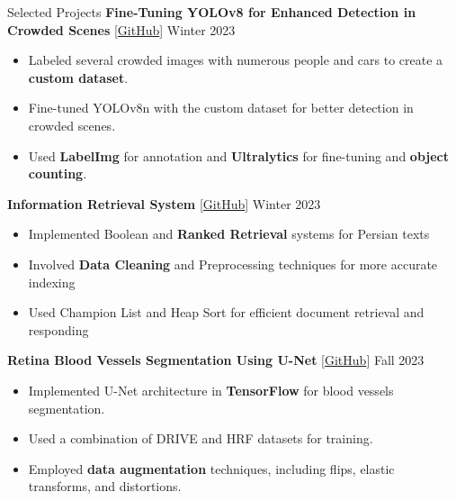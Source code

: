 \documentclass{resume}
\begin{document}
\begin{rSection}{Selected Projects}
    {\bf Fine-Tuning YOLOv8 for Enhanced Detection in Crowded Scenes} [\href{https://github.com/SepehrNoey/Fine-Tuning-YOLOv8n-for-Enhanced-Detection}{GitHub}] \hspace{3em} {Winter 2023}
    \vspace{-1.6em}
    \begin{itemize}[topsep=0pt, leftmargin=1em, label=$\circ$]
        \item Labeled several crowded images with numerous people and cars to create a {\bf custom dataset}.
        \item Fine-tuned YOLOv8n with the custom dataset for better detection in crowded scenes. 
        \item Used {\bf LabelImg} for annotation and {\bf Ultralytics} for fine-tuning and {\bf object counting}.
    \end{itemize}

    {\bf Information Retrieval System} [\href{https://github.com/SepehrNoey/Information-Retrieval}{GitHub}] \hspace{18em} {Winter 2023}
    \vspace{-1.6em}
    \begin{itemize}[topsep=0pt, leftmargin=1em, label=$\circ$]
        \item Implemented Boolean and {\bf Ranked Retrieval} systems for Persian texts
        \item Involved {\bf Data Cleaning} and Preprocessing techniques for more accurate indexing
        \item Used Champion List and Heap Sort for efficient document retrieval and responding 
    \end{itemize}

    {\bf Retina Blood Vessels Segmentation Using U-Net} [\href{https://github.com/SepehrNoey/Retina-Blood-Vessels-Segmentation-Using-Unet}{GitHub}] \hspace{11em} {Fall 2023}
    \vspace{-1.6em}
    \begin{itemize}[topsep=0pt, leftmargin=1em, label=$\circ$]
        \item Implemented U-Net architecture in {\bf TensorFlow} for blood vessels segmentation.
        \item Used a combination of DRIVE and HRF datasets for training.
        \item Employed {\bf data augmentation} techniques, including flips, elastic transforms, and distortions.
    \end{itemize}


\end{rSection}
\end{document}
